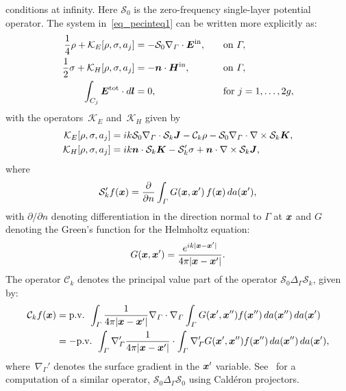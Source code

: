 \documentclass[11pt]{article}
\newcommand{\vct}{\vectorsym}
\newcommand{\surfdiv}{\nabla_\Gamma \cdot}
\newcommand{\surfgrad}{\nabla_\Gamma}
\newcommand{\surflap}{\Delta_\Gamma}
\newcommand{\bx}{\vct{ x}}
\newcommand{\bJ}{\vct{ J}}
\newcommand{\bK}{\vct{ K}}
\newcommand{\cS}{\mathcal S}
\newcommand{\cC}{\mathcal C}
\newcommand{\cK}{\mathcal K}
\newcommand\nhat{\vct{ {n}}}
\newcommand\bl{\vct{ l}}
\newcommand\bEtot{\vct{E}^\textnormal{tot}}
\newcommand\bEin{\vct{E}^\textnormal{in}}
\newcommand\bHin{\vct{H}^\textnormal{in}}
\numberwithin{equation}{section}
\begin{document}
conditions at infinity.
Here $\cS_0$ is the
zero-frequency single-layer potential operator.
The system in~\eqref{eq_pecinteq1} can be written more explicitly as:
\begin{equation}\label{eq_system}
  \begin{aligned}
    \frac{1}{4} \rho + \cK_{E}[\rho, \sigma, a_j] &= -\cS_0 \surfdiv
    \bEin, 
         &\quad &\text{on } \Gamma, \\
    \frac{1}{2} \sigma + \cK_{H} [\rho, \sigma, a_j] &= - \nhat \cdot \bHin,  
            & &\text{on } \Gamma, \\
     \int_{C_j} \bEtot \cdot d\bl &= 0, & &\text{for } j = 1,\ldots,
     2g,
  \end{aligned}
\end{equation}
with the operators~$\cK_E$ and~$\cK_H$ given by
\begin{equation}\label{eq_koperators}
  \begin{aligned}
    \cK_E[\rho,\sigma,a_j] &= ik\cS_0 \surfdiv \cS_k \bJ - \cC_k \rho
    - \cS_0 \surfdiv \nabla \times \cS_k \bK, \\
    \cK_H[\rho,\sigma,a_j] &= ik\nhat \cdot \cS_k \bK 
    - \cS'_k \sigma + \nhat \cdot \nabla \times \cS_k \bJ,
  \end{aligned}
\end{equation}
where
\begin{equation}
  \cS_k'f(\bx) = \frac{\partial}{\partial n} \int_\Gamma G(\bx,\bx')
  \, f(\bx) \, da(\bx'),
\end{equation}
with $\partial/\partial n$ denoting differentiation in the direction
normal to $\Gamma$ at $\bx$ and $G$ denoting the Green's function for
the Helmholtz equation:
\begin{equation}
  G(\bx,\bx') = \frac{e^{ik|\bx-\bx'|}}{4\pi | \bx-\bx' |}.
\end{equation}
The operator $\cC_k$ denotes the principal value part of the operator
$\cS_0 \surflap \cS_k$, given by:
\begin{equation}\label{eq:sls}
  \begin{aligned}
    \cC_k f(\bx) &=  \text{p.v. } \int_\Gamma
    \frac{1}{4\pi|\bx-\bx'|} \surfdiv \surfgrad \int_\Gamma G(\bx',\bx'')
    f(\bx'') \, da(\bx'') \, da(\bx') \\
    &=  -\text{p.v. } \int_\Gamma
    \surfgrad' \frac{1}{4\pi|\bx-\bx'|} \cdot
    \int_\Gamma \surfgrad' G(\bx',\bx'') f(\bx'') \, da(\bx'') \, da(\bx'),
  \end{aligned}
  \end{equation}
where~$\surfgrad'$ denotes the surface gradient in the $\bx'$
variable. See~\cite{oneil2017} for a computation of a similar
operator, $\cS_0 \surflap \cS_0$ using Cald\'eron projectors.
\end{document}
